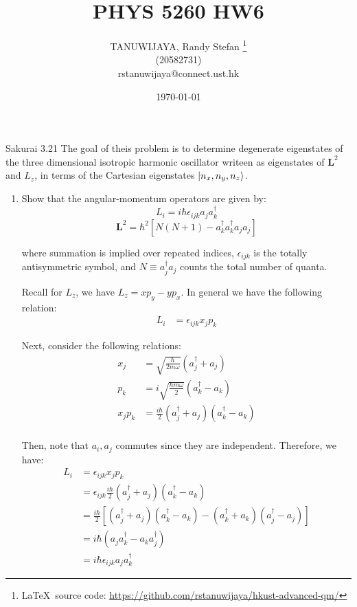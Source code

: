 \documentclass{article}
\title{PHYS 5260 HW6}
\author{TANUWIJAYA, Randy Stefan \footnote{\LaTeX\ source code: \url{https://github.com/rstanuwijaya/hkust-advanced-qm/}}
\\ (20582731) \\ rstanuwijaya@connect.ust.hk}
\affil{Department of Physics - HKUST}
\date{\today}
\newcommand{\bs}{\boldsymbol}
\begin{document}
\maketitle
\begin{section}{Sakurai 3.21}
The goal of theis problem is to determine degenerate eigenstates of the three dimensional isotropic harmonic oscillator writeen as eigenstates of $\bs{L}^2$ and $L_z$, in terms of the Cartesian eigenstates $\ket{n_x, n_y, n_z}$.

\begin{enumerate}
	\item Show that the angular-momentum operators are given by:
	$$
		L_i = i\hbar \epsilon_{ijk} a_j a_k^\dagger
	$$
	$$
		\bs{L}^2 = \hbar^2 \left[ N(N+1) - a_k^\dagger a_k^\dagger a_j a_j \right]
	$$

	where summation is implied over repeated indices, $\epsilon_{ijk}$ is the totally antisymmetric symbol, and $N \equiv a_j^\dagger a_j$ counts the total number of quanta.

	\begin{tcolorbox}[breakable]
		Recall for $L_z$, we have $L_z = x p_y - y p_x$. In general we have the following relation:
		\begin{align*}
			L_i & = \epsilon_{ijk} x_j p_k
		\end{align*}

		Next, consider the following relations:
		\begin{align*}
			x_j     & = \sqrt{\frac{\hbar}{2 m \omega}} (a_j^\dagger + a_j)       \\
			p_k     & = i \sqrt{\frac{\hbar m \omega}{2}} (a_k^\dagger - a_k)     \\
			x_j p_k & = \frac{i \hbar}{2} (a_j^\dagger + a_j) (a_k^\dagger - a_k) \\
		\end{align*}

		Then, note that $a_i, a_j$ commutes since they are independent. Therefore, we have:
		\begin{align*}
			L_i & = \epsilon_{ijk} x_j p_k                                                                                \\
			    & = \epsilon_{ijk} \frac{i \hbar}{2} (a_j^\dagger + a_j) (a_k^\dagger - a_k)                              \\
			    & = \frac{i \hbar}{2} [(a_j^\dagger + a_j) (a_k^\dagger - a_k) - (a_k^\dagger + a_k) (a_j^\dagger - a_j)] \\
			    & = i\hbar (a_j a_k^\dagger - a_k a_j^\dagger)                                                            \\
			    & = i\hbar \epsilon_{ijk} a_j a_k^\dagger
		\end{align*}


\end{tcolorbox}
\end{enumerate}
\end{section}
\end{document}
